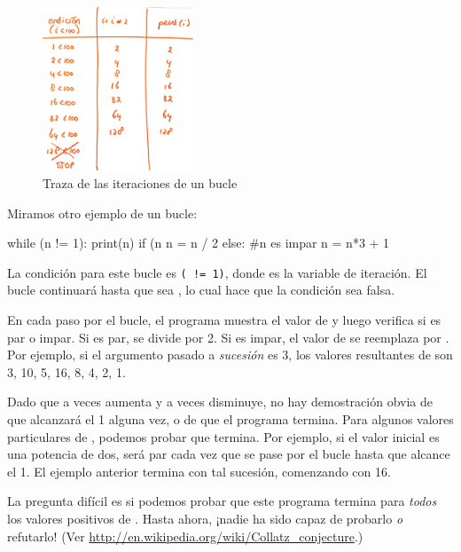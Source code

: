 \begin{figure}[t]
    \centering
    \includegraphics[width=0.4\textwidth]{images/traza.png}
    \caption{Traza de las iteraciones de un bucle}
    \label{fig:traza}
\end{figure}


Miramos otro ejemplo de un bucle:

\begin{python}[frame=single]
while (n != 1):
    print(n)
    if (n %
        n = n / 2
    else:                 #n es impar
        n = n*3 + 1
\end{python}
%
La condición para este bucle es \texttt{( != 1)}, donde
 es la variable de iteración. El bucle continuará
hasta que  sea , lo cual hace que la condición sea falsa.

En cada paso por el bucle, el programa muestra el valor de 
y luego verifica si es par o impar.  Si es par,  se
divide por 2.  Si es impar, el valor de  se reemplaza por
. Por ejemplo, si el argumento pasado a \emph{sucesión}
es 3, los valores resultantes de  son 3, 10, 5, 16, 8, 4, 2, 1.

Dado que  a veces aumenta y a veces disminuye, no hay
demostración obvia de que  alcanzará el 1 alguna vez, o de que el programa
termina.  Para algunos valores particulares de , podemos probar que
termina.  Por ejemplo, si el valor inicial es una potencia de dos,
 será par cada vez que se pase por el bucle
hasta que alcance el 1. El ejemplo anterior termina con tal sucesión,
comenzando con 16.

La pregunta difícil es si podemos probar que este programa termina
para {\em todos} los valores positivos de .  Hasta ahora, ¡nadie ha
sido capaz de probarlo {\em o} refutarlo!  (Ver
  \url{http://en.wikipedia.org/wiki/Collatz_conjecture}.)


